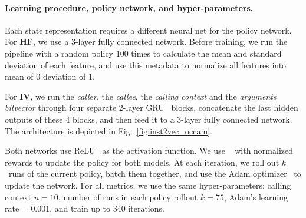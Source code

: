 \paragraph{Learning procedure, policy network, and hyper-parameters.}
Each state representation requires a different neural net for the policy network.
%
For \textbf{HF}, we use a $3$-layer fully connected network. Before training, we run the
pipeline with a random policy $100$ times to calculate the mean and standard
deviation of each feature, and use this metadata to normalize all features into
mean of $0$ deviation of $1$.

For \textbf{IV}, we run the \emph{caller}, the \emph{callee}, the \emph{calling context}
and the \emph{arguments bitvector} through four separate $2$-layer
GRU~\cite{gru} blocks, concatenate the last hidden outputs of these $4$ blocks,
and then feed it to a $3$-layer fully connected network. The architecture is
depicted in Fig.~\ref{fig:inst2vec_occam}.

Both networks use ReLU~\cite{relu} as the activation function. 
We use \reinforce~\cite{reinforce} with normalized rewards to update
the policy for both models. At each \reinforce iteration, we roll out
$k$~runs of the current policy, batch them together, and use the Adam
optimizer~\cite{adam} to update the network. For all metrics, we use the same
hyper-parameters: \insttovec calling
context $n = 10$, number of runs in each policy rollout $k =75$, Adam's learning rate = $0.001$, and train up to $340$ iterations.

